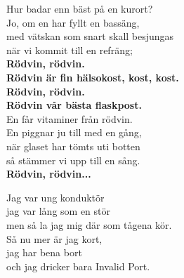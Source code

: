 \documentclass[a6paper,10pt]{article}
\begin{document}
\setlength{\oddsidemargin}{-0.37in}
\noindent
\begin{center}
\end{center}
\begin{lyrics}
Hur badar enn bäst på en kurort?\\
Jo, om en har fyllt en bassäng,\\
med vätskan som snart skall besjungas\\
när vi kommit till en refräng;
\vspace{5pt}\\
\textbf{Rödvin, rödvin.\\
Rödvin är fin hälsokost, kost, kost.\\
Rödvin, rödvin.\\
Rödvin vår bästa flaskpost.}
\vspace{5pt}\\
En får vitaminer från rödvin.\\
En piggnar ju till med en gång,\\
när glaset har tömts uti botten\\
så stämmer vi upp till en sång.
\vspace{5pt}\\
\textbf{Rödvin, rödvin...}
\end{lyrics}
\vspace{30pt}
\begin{center}
\end{center}
\begin{lyrics}
Jag var ung konduktör\\
jag var lång som en stör\\
men så la jag mig där som tågena kör.
\vspace{5pt}\\
Så nu mer är jag kort,\\
jag har bena bort\\
och jag dricker bara Invalid Port.
\end{lyrics}
\end{document}
